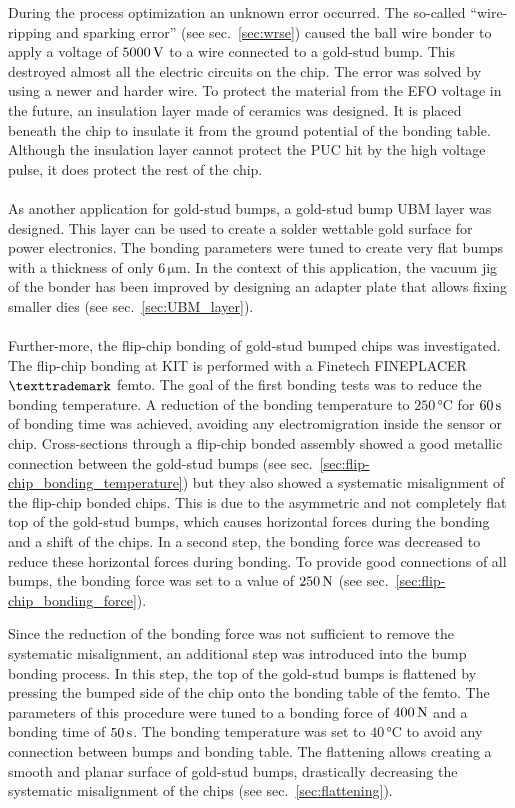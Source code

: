 During the process optimization an unknown error occurred. The so-called ``wire-ripping and sparking error'' (see sec.~\ref{sec:wrse}) caused the ball wire bonder to apply a voltage of $5000\,\rm{V}$ to a wire connected to a gold-stud bump. This destroyed almost all the electric circuits on the chip. The error was solved by using a newer and harder wire. To protect the material from the EFO voltage in the future, an insulation layer made of ceramics was designed. It is placed beneath the chip to insulate it from the ground potential of the bonding table. Although the insulation layer cannot protect the \acl{PUC} hit by the high voltage pulse, it does protect the rest of the chip.
\\
\\As another application for gold-stud bumps, a gold-stud bump UBM layer was designed. This layer can be used to create a solder wettable gold surface for power electronics. The bonding parameters were tuned to create very flat bumps with a thickness of only $6\,\si{\micro \meter}$. In the context of this application, the vacuum jig of the bonder has been improved by designing an adapter plate that allows fixing smaller dies (see sec.~\ref{sec:UBM_layer}). 
\\
\\
Further-more, the flip-chip bonding of gold-stud bumped chips was investigated. The flip-chip bonding at \ac{KIT} is performed with a Finetech FINEPLACER$\rm{\symbTM}$ femto. The goal of the first bonding tests was to reduce the bonding temperature. A reduction of the bonding temperature to $250\,\si{\degreeCelsius}$ for $60\,\rm{s}$ of bonding time was achieved, avoiding any electromigration inside the sensor or chip. Cross-sections through a flip-chip bonded assembly showed a good metallic connection between the gold-stud bumps (see sec.~\ref{sec:flip-chip_bonding_temperature}) but they also showed a systematic misalignment of the flip-chip bonded chips. This is due to the asymmetric and not completely flat top of the gold-stud bumps, which causes horizontal forces during the bonding and a shift of the chips. In a second step, the bonding force was decreased to reduce these horizontal forces during bonding. To provide good connections of all bumps, the bonding force was set to a value of $250\,\rm{N}$ (see sec.~\ref{sec:flip-chip_bonding_force}).

Since the reduction of the bonding force was not sufficient to remove the systematic misalignment, an additional step was introduced into the bump bonding process. In this step, the top of the gold-stud bumps is flattened by pressing the bumped side of the chip onto the bonding table of the femto. The parameters of this procedure were tuned to a bonding force of $400\,\rm{N}$ and a bonding time of $50\,\rm{s}$. The bonding temperature was set to $40\,\si{\degreeCelsius}$ to avoid any connection between bumps and bonding table. The flattening allows creating a smooth and planar surface of gold-stud bumps, drastically decreasing the systematic misalignment of the chips (see sec.~\ref{sec:flattening}).

